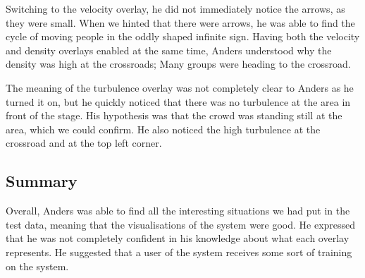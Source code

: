 Switching to the velocity overlay, he did not immediately notice the arrows, as they were small. When we hinted that there were arrows, he was able to find the cycle of moving people in the oddly shaped infinite sign. Having both the velocity and density overlays enabled at the same time, Anders understood why the density was high at the crossroads; Many groups were heading to the crossroad.

The meaning of the turbulence overlay was not completely clear to Anders as he turned it on, but he quickly noticed that there was no turbulence at the area in front of the stage. His hypothesis was that the crowd was standing still at the area, which we could confirm. He also noticed the high turbulence at the crossroad and at the top left corner.

\subsection{Summary}
Overall, Anders was able to find all the interesting situations we had put in the test data, meaning that the visualisations of the system were good. He expressed that he was not completely confident in his knowledge about what each overlay represents. He suggested that a user of the system receives some sort of training on the system.







